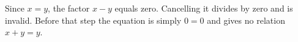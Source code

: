 Since $ x=y $, the factor $ x-y $ equals zero. Cancelling it divides by zero and is invalid. Before that step the equation is simply $ 0=0 $ and gives no relation $ x+y=y $.
